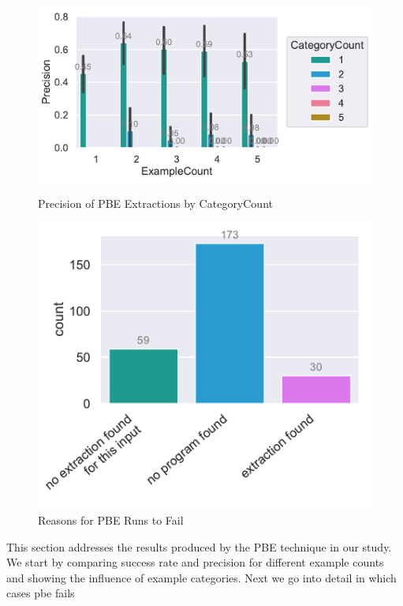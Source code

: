 \documentclass[\myrootdir/main.tex]{subfiles}
\begin{document}
\begin{figure}[htbp]
	\centering
	\begin{minipage}{0.45\textwidth}
		\centering
		\includegraphics[width=\textwidth, clip]{img/big-study/precision-categorycount-examplecount-pbe.pdf}
		\caption{Precision of PBE Extractions by CategoryCount}
		\label{fig:precision-categorycount-examplecount-pbe}
	\end{minipage}\hfill
	\begin{minipage}{0.45\textwidth}
		\centering
		\includegraphics[width=\textwidth, clip]{img/big-study/failure-reason-pbe.pdf}
		\caption{Reasons for PBE Runs to Fail}
		\label{fig:failure-reason-pbe}
	\end{minipage}
\end{figure}

This section addresses the results produced by the PBE technique in our study.
We start by comparing success rate and precision for different example counts and showing the influence of example categories.
Next we go into detail in which cases pbe fails
\end{document}
